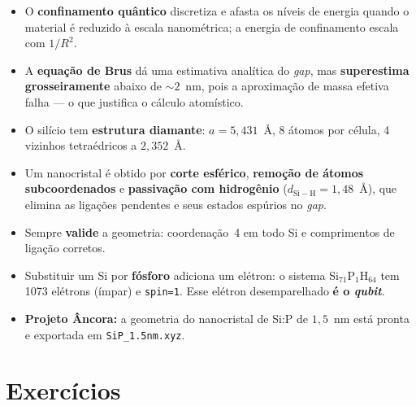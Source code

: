 \documentclass[11pt,a4paper,openany]{book}
\newcommand{\code}[1]{\texttt{#1}}
\newcommand{\qubit}{\emph{qubit}}
\begin{document}
\begin{itemize}[leftmargin=*]
  \item O \textbf{confinamento quântico} discretiza e afasta os níveis de energia
        quando o material é reduzido à escala nanométrica; a energia de
        confinamento escala com $1/R^2$.
  \item A \textbf{equação de Brus} dá uma estimativa analítica do \emph{gap}, mas
        \textbf{superestima grosseiramente} abaixo de $\sim 2$~nm, pois a
        aproximação de massa efetiva falha --- o que justifica o cálculo
        atomístico.
  \item O silício tem \textbf{estrutura diamante}: $a = 5{,}431$~Å, 8 átomos por
        célula, 4 vizinhos tetraédricos a $2{,}352$~Å.
  \item Um nanocristal é obtido por \textbf{corte esférico}, \textbf{remoção de
        átomos subcoordenados} e \textbf{passivação com hidrogênio}
        ($d_{\mathrm{Si-H}} = 1{,}48$~Å), que elimina as ligações pendentes e seus
        estados espúrios no \emph{gap}.
  \item Sempre \textbf{valide} a geometria: coordenação~4 em todo Si e
        comprimentos de ligação corretos.
  \item Substituir um Si por \textbf{fósforo} adiciona um elétron: o sistema
        Si$_{71}$P$_1$H$_{64}$ tem 1073 elétrons (ímpar) e \code{spin=1}. Esse
        elétron desemparelhado \textbf{é o \qubit{}}.
  \item \textbf{Projeto Âncora:} a geometria do nanocristal de Si:P de $1{,}5$~nm
        está pronta e exportada em \code{SiP\_1.5nm.xyz}.
\end{itemize}

\section*{Exercícios}
\end{document}

